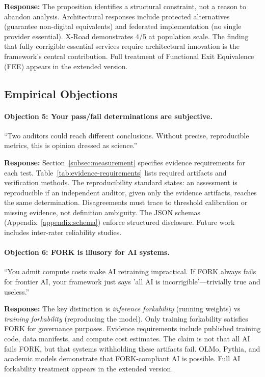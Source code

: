 \documentclass{article}
\begin{document}
\textbf{Response:} The proposition identifies a structural constraint, not a reason to abandon analysis. Architectural responses include protected alternatives (guarantee non-digital equivalents) and federated implementation (no single provider essential). X-Road demonstrates 4/5 at population scale. The finding that fully corrigible essential services require architectural innovation is the framework's central contribution. Full treatment of Functional Exit Equivalence (FEE) appears in the extended version.

\subsection{Empirical Objections}

\paragraph{Objection 5: Your pass/fail determinations are subjective.}
``Two auditors could reach different conclusions. Without precise, reproducible metrics, this is opinion dressed as science.''

\textbf{Response:} Section~\ref{subsec:measurement} specifies evidence requirements for each test. Table~\ref{tab:evidence-requirements} lists required artifacts and verification methods. The reproducibility standard states: an assessment is reproducible if an independent auditor, given only the evidence artifacts, reaches the same determination. Disagreements must trace to threshold calibration or missing evidence, not definition ambiguity. The JSON schemas (Appendix~\ref{appendix:schema}) enforce structured disclosure. Future work includes inter-rater reliability studies.

\paragraph{Objection 6: FORK is illusory for AI systems.}
``You admit compute costs make AI retraining impractical. If FORK always fails for frontier AI, your framework just says 'all AI is incorrigible'---trivially true and useless.''

\textbf{Response:} The key distinction is \textit{inference forkability} (running weights) vs \textit{training forkability} (reproducing the model). Only training forkability satisfies FORK for governance purposes. Evidence requirements include published training code, data manifests, and compute cost estimates. The claim is not that all AI fails FORK, but that systems withholding these artifacts fail. OLMo, Pythia, and academic models demonstrate that FORK-compliant AI is possible. Full AI forkability treatment appears in the extended version.
\end{document}
